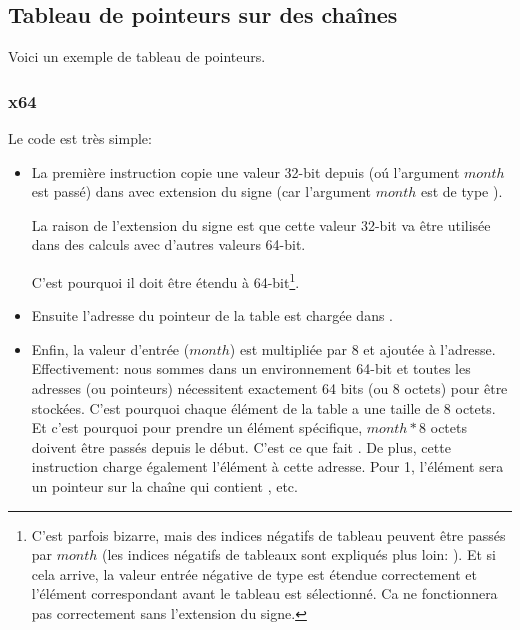 ﻿\subsection{Tableau de pointeurs sur des chaînes}
\label{array_of_pointers_to_strings}

Voici un exemple de tableau de pointeurs.



\subsubsection{x64}



Le code est très simple:

\begin{itemize}

\item
{}

La première instruction  copie une valeur 32-bit depuis \ECX (oú l'argument
$month$ est passé) dans \RAX avec extension du signe (car l'argument $month$ est
de type \Tint).

La raison de l'extension du signe est que cette valeur 32-bit va être utilisée dans
des calculs avec d'autres valeurs 64-bit.

C'est pourquoi il doit être étendu à 64-bit\footnote{C'est parfois bizarre, mais des
indices négatifs de tableau peuvent être passés par $month$ (les indices négatifs
de tableaux sont expliqués plus loin: ).
Et si cela arrive, la valeur entrée négative de type \Tint est étendue correctement
et l'élément correspondant avant le tableau est sélectionné.
Ca ne fonctionnera pas correctement sans l'extension du signe.}.

\item
Ensuite l'adresse du pointeur de la table est chargée dans \RCX.

\item
Enfin, la valeur d'entrée ($month$) est multipliée par 8 et ajoutée à l'adresse.
Effectivement: nous sommes dans un environnement 64-bit et toutes les adresses (ou
pointeurs) nécessitent exactement 64 bits (ou 8 octets) pour être stockées.
C'est pourquoi chaque élément de la table a une taille de 8 octets.
Et c'est pourquoi pour prendre un élément spécifique, $month*8$ octets doivent être
passés depuis le début.
C'est ce que fait \MOV.
De plus, cette instruction charge également l'élément à cette adresse.
Pour 1, l'élément sera un pointeur sur la chaîne qui contient , etc.

\end{itemize}

